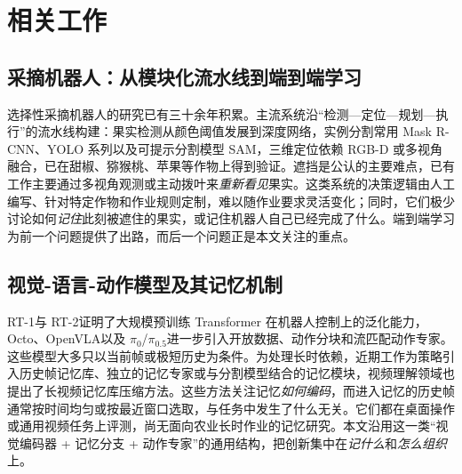\section{相关工作}
\label{sec:related}

\subsection{采摘机器人：从模块化流水线到端到端学习}
选择性采摘机器人的研究已有三十余年积累\cite{bac2014harvesting,kootstra2021selective,zhou2022intelligent}。主流系统沿“检测—定位—规划—执行”的流水线构建：果实检测从颜色阈值发展到深度网络\cite{sa2016deepfruits,koirala2019review,kamilaris2018survey}，实例分割常用 Mask R-CNN\cite{he2017maskrcnn}、YOLO 系列\cite{redmon2016yolo}以及可提示分割模型 SAM\cite{kirillov2023sam,ravi2024sam2}，三维定位依赖 RGB-D 或多视角融合\cite{gene2020fruit,kang2020apple}，已在甜椒、猕猴桃、苹果等作物上得到验证\cite{arad2020sweetpepper,williams2019kiwifruit,silwal2017apple}。遮挡是公认的主要难点\cite{hemming2014detectability,bac2014harvesting}，已有工作主要通过多视角观测或主动拨叶来\emph{重新看见}果实。这类系统的决策逻辑由人工编写、针对特定作物和作业规则定制，难以随作业要求灵活变化；同时，它们极少讨论如何\emph{记住}此刻被遮住的果实，或记住机器人自己已经完成了什么。端到端学习为前一个问题提供了出路，而后一个问题正是本文关注的重点。

\subsection{视觉-语言-动作模型及其记忆机制}
RT-1\cite{brohan2023rt1}与 RT-2\cite{brohan2023rt2}证明了大规模预训练 Transformer 在机器人控制上的泛化能力，Octo\cite{octo2024}、OpenVLA\cite{kim2024openvla}以及 $\pi_0$/$\pi_{0.5}$\cite{black2024pi0,pi05_2025}进一步引入开放数据、动作分块和流匹配动作专家\cite{lipman2023flow,zhao2023act,chi2023diffusion}。这些模型大多只以当前帧或极短历史为条件。为处理长时依赖，近期工作为策略引入历史帧记忆库、独立的记忆专家或与分割模型结合的记忆模块\cite{shi2025memoryvla,fang2025sam2act}，视频理解领域也提出了长视频记忆库压缩方法\cite{he2024malmm}。这些方法关注记忆\emph{如何编码}，而进入记忆的历史帧通常按时间均匀或按最近窗口选取，与任务中发生了什么无关。它们都在桌面操作或通用视频任务上评测，尚无面向农业长时作业的记忆研究。本文沿用这一类“视觉编码器 + 记忆分支 + 动作专家”的通用结构，把创新集中在\emph{记什么}和\emph{怎么组织}上。

